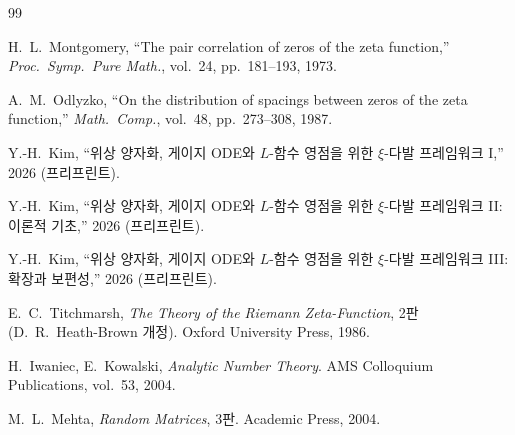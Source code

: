 \documentclass[11pt,a4paper]{article}
\theoremstyle{plain}
\theoremstyle{definition}
\begin{document}
\begin{thebibliography}{99}

H.~L.~Montgomery,
``The pair correlation of zeros of the zeta function,''
\textit{Proc.\ Symp.\ Pure Math.}, vol.~24, pp.~181--193, 1973.

A.~M.~Odlyzko,
``On the distribution of spacings between zeros of the zeta function,''
\textit{Math.\ Comp.}, vol.~48, pp.~273--308, 1987.

Y.-H.~Kim,
``위상 양자화, 게이지 ODE와 $L$-함수 영점을 위한 $\xi$-다발 프레임워크 I,''
2026 (프리프린트).

Y.-H.~Kim,
``위상 양자화, 게이지 ODE와 $L$-함수 영점을 위한 $\xi$-다발 프레임워크 II:
이론적 기초,''
2026 (프리프린트).

Y.-H.~Kim,
``위상 양자화, 게이지 ODE와 $L$-함수 영점을 위한 $\xi$-다발 프레임워크 III:
확장과 보편성,''
2026 (프리프린트).

E.~C.~Titchmarsh,
\textit{The Theory of the Riemann Zeta-Function}, 2판
(D.~R.~Heath-Brown 개정). Oxford University Press, 1986.

H.~Iwaniec, E.~Kowalski,
\textit{Analytic Number Theory}.
AMS Colloquium Publications, vol.~53, 2004.

M.~L.~Mehta,
\textit{Random Matrices}, 3판. Academic Press, 2004.

\end{thebibliography}
\end{document}
